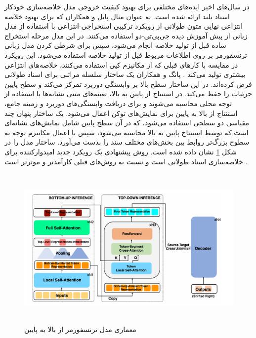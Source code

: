 
در سال‌های اخیر ایده‌های مختلفی برای بهبود کیفیت خروجی مدل خلاصه‌سازی خودکار اسناد بلند ارائه شده است. به عنوان مثال پایل
و همکاران که برای بهبود خلاصه انتزاعی نهایی متون طولانی از رویکرد ترکیبی استخراجی-انتزاعی با استفاده از مدل زبانی از پیش آموزش دیده جی‌پی‌تی-دو
استفاده می‌کنند. در این مدل مرحله استخراج ساده قبل از تولید خلاصه انجام می‌شود، سپس برای شرطی کردن مدل زبانی ترنسفورمر بر روی اطلاعات مربوط قبل از تولید خلاصه استفاده می‌شود. این رویکرد در مقایسه با کارهای قبلی که از مکانیزم کپی استفاده می‌کنند، خلاصه‌های انتزاعی بیشتری تولید می‌کند \cite{pilault2020extractive}. 
پانگ
و همکاران یک ساختار سلسله مراتبی برای اسناد طولانی فرض کرده‌اند. در این ساختار سطح بالا بر وابستگی دوربرد تمرکز می‌کند و سطح پایین جزئیات را حفظ می‌کند. 
در استنتاج از پایین به بالا، تعبیه‌های متنی نشانه‌ها با استفاده از توجه محلی محاسبه می‌شوند و برای دریافت وابستگی‌های دوربرد و زمینه جامع، استنتاج از بالا به پایین برای نمایش‌های توکن اعمال می‌شود. یک ساختار پنهان چند مقیاسی دو سطحی استفاده می‌شود، که در آن سطح پایین شامل نمایش‌های نشانه‌ای است که توسط استنتاج پایین به بالا محاسبه می‌شود، سپس با اعمال مکانیزم توجه به سطوح بزرگ‌تر روابط بین بخش‌های مختلف سند را بدست می‌آورد. ساختار مدل را در شکل \ref{fig:top_down} نشان داده شده است. روش پیشنهادی یک رویکرد جدید امیدوارکننده برای خلاصه‌سازی اسناد طولانی است و نسبت به روش‌های قبلی کارآمدتر و موثرتر است \cite{pang2023long}.

\begin{figure}[!h]
	\begin{center}
		\includegraphics[height=8cm]{top_down.png}
	\end{center}
	\caption{ معماری مدل ترنسفورمر از بالا به پایین \cite{pang2023long}}
	\label{fig:top_down}
	\medskip
	
\end{figure}


